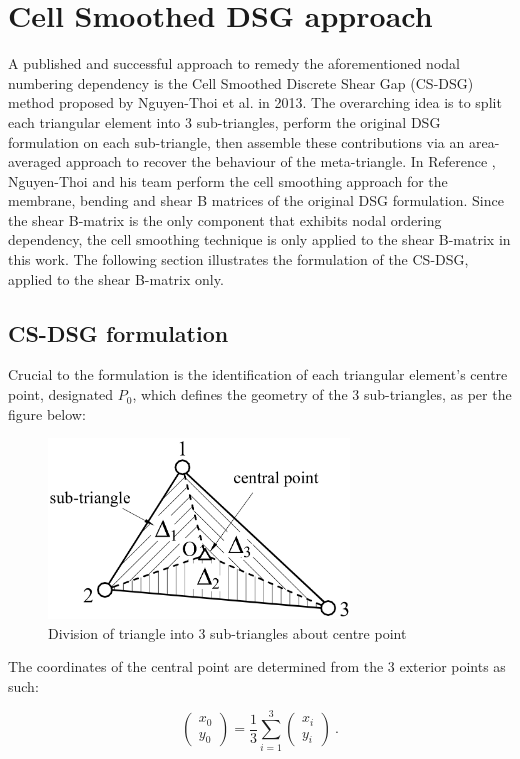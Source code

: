 \section{Cell Smoothed DSG approach}
A published and successful approach to remedy the aforementioned nodal numbering dependency is the Cell Smoothed Discrete Shear Gap (CS-DSG) method proposed by Nguyen-Thoi et al. \cite{Ngu13} in 2013. The overarching idea is to split each triangular element into 3 sub-triangles, perform the original DSG formulation on each sub-triangle, then assemble these contributions via an area-averaged approach to recover the behaviour of the meta-triangle. In Reference \cite{Ngu13}, Nguyen-Thoi and his team perform the cell smoothing approach for the membrane, bending and shear B matrices of the original DSG formulation. Since the shear B-matrix is the only component that exhibits nodal ordering dependency, the cell smoothing technique is only applied to the shear B-matrix in this work. The following section illustrates the formulation of the CS-DSG, applied to the shear B-matrix only.

\subsection{CS-DSG formulation}
Crucial to the formulation is the identification of each triangular element's centre point, designated $P_0$, which defines the geometry of the 3 sub-triangles, as per the figure below:

\begin{figure}[H]
	\centering
	\includegraphics[width=8cm]{images/CSDSG3_subtriangles.png}
	\caption{Division of triangle into 3 sub-triangles about centre point \cite{phung2013static}}
	\label{fig:triangle division}
\end{figure}

The coordinates of the central point are determined from the 3 exterior points as such:

\begin{equation} 
\begin{pmatrix}
x_0 \\
y_0
\end{pmatrix}
=
\frac{1}{3}
\sum_{i=1}^3
\begin{pmatrix}
x_i \\
y_i
\end{pmatrix}
\label{eqCSDSG0}\ .
\end{equation}

